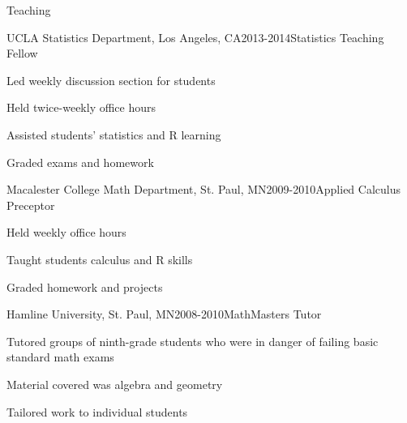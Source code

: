 \documentclass{resume} %
\begin{document}
\clearpage
\begin{rSection}{Teaching}

\begin{rSubsection}{UCLA Statistics Department, }{Los Angeles, CA}{2013-2014}{Statistics Teaching Fellow}
\item Led weekly discussion section for students
\item Held twice-weekly office hours
\item Assisted students' statistics and R learning
\item Graded exams and homework
\end{rSubsection}

\begin{rSubsection}{Macalester College Math Department, }{St. Paul, MN}{2009-2010}{Applied Calculus Preceptor}
\item Held weekly office hours
\item Taught students calculus and R skills
\item Graded homework and projects
\end{rSubsection}

\begin{rSubsection}{Hamline University, }{St. Paul, MN}{2008-2010}{MathMasters Tutor}
\item Tutored groups of ninth-grade students who were in danger of failing basic standard math exams
\item Material covered was algebra and geometry
\item Tailored work to individual students
\end{rSubsection}

\end{rSection}
\end{document}
